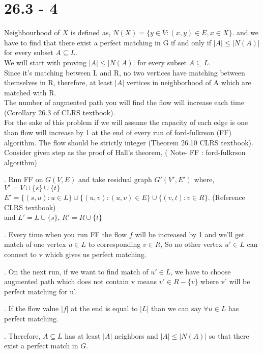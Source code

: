\documentclass[a4paper, 11pt]{article}
\begin{document}
\section{26.3 - 4}
Neighbourhood of $X$ is defined as,
$N(X) = \{ y \in V : (x,y) \in E ,x \in X\}$. and we have to find that there exist a perfect matching in G if and only if $|A| \leq |N(A)|$ for every subset $A \subseteq L$.\\
We will start with proving $|A| \leq |N(A)|$ for every subset $A \subseteq L$.\\
Since it's matching between L and R, no two vertices have matching between themselves in R, therefore, at least $|A|$ vertices in neighborhood of A which are matched with R.\\
The number of augmented path you will find the flow will increase each time (Corollary 26.3 of CLRS textbook). \\
For the sake of this problem if we will assume the capacity of each edge is one than flow will increase by 1 at the end of every run of ford-fulkrson (FF) algorithm. The flow should be strictly integer (Theorem 26.10 CLRS textbook).\\
Consider given step as the proof of Hall's theorem, ( Note- FF : ford-fulkrson algorithm)

\vspace{5mm}
. Run FF on $G(V,E)$ and take residual graph $G'(V',E')$ where,\\
$V' = V \cup \{s\} \cup \{ t\} $\\
$E' = \{ (s,u) : u \in L \} \cup \{(u,v) : (u,v) \in E \} \cup \{ (v,t) : v \in R \}.$ (Reference CLRS textbook)\\
and $L' = L \cup \{ s\} $, $R' = R \cup \{ t\}$

\vspace{5mm}
. Every time when you run FF the flow $f$ will be increased by 1 and we'll get match of one vertex $u \in L$ to corresponding $v \in R$, So no other vertex $u' \in L$ can connect to v which gives us perfect matching.

\vspace{5mm}
. On the next run, if we want to find match of $u' \in L$, we have to choose augmented path which does not contain v means $v' \in R - \{ v \}$ where v' will be perfect matching for u'.

\vspace{5mm}
. If the flow value $|f|$ at the end is equal to $|L|$ than we can say $\forall  u \in L $ has perfect matching.

\vspace{5mm}
. Therefore, $A \subseteq L$ has at least $|A| $ neighbors and $|A| \leq |N(A)|$ so that there exist a perfect match in $G$.
\end{document}
